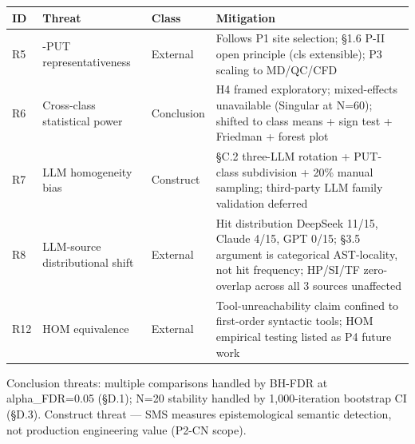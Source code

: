 \documentclass[review,12pt,authoryear]{elsarticle}
\newcounter{none}                   %
\begin{document}
{\def\LTcaptype{none} %
\begin{longtable}[]{@{}
  >{\raggedright\arraybackslash}p{}
  >{\raggedright\arraybackslash}p{}
  >{\raggedright\arraybackslash}p{}
  >{\raggedright\arraybackslash}p{}@{}}
\toprule\noalign{}
\begin{minipage}[b]{\linewidth}\raggedright
ID
\end{minipage} & \begin{minipage}[b]{\linewidth}\raggedright
Threat
\end{minipage} & \begin{minipage}[b]{\linewidth}\raggedright
Class
\end{minipage} & \begin{minipage}[b]{\linewidth}\raggedright
Mitigation
\end{minipage} \\
\midrule\noalign{}
\endhead
\bottomrule\noalign{}
\endlastfoot
R5 & 12-PUT representativeness & External & Follows P1 site selection;
§1.6 P-II open principle (cls extensible); P3 scaling to MD/QC/CFD \\
R6 & Cross-class statistical power & Conclusion & H4 framed exploratory;
mixed-effects unavailable (Singular at N=60); shifted to class means +
sign test + Friedman + forest plot \\
R7 & LLM homogeneity bias & Construct & §C.2 three-LLM rotation +
PUT-class subdivision + 20\% manual sampling; third-party LLM family
validation deferred \\
R8 & LLM-source distributional shift & External & Hit distribution
DeepSeek 11/15, Claude 4/15, GPT 0/15; §3.5 argument is categorical
AST-locality, not hit frequency; HP/SI/TF zero-overlap across all 3
sources unaffected \\
R12 & HOM equivalence & External & Tool-unreachability claim confined to
first-order syntactic tools; HOM empirical testing listed as P4 future
work \\
\end{longtable}
}

Conclusion threats: multiple comparisons handled by BH-FDR at
alpha\_FDR=0.05 (§D.1); N=20 stability handled by 1,000-iteration
bootstrap CI (§D.3). Construct threat --- SMS measures epistemological
semantic detection, not production engineering value (P2-CN scope).
\end{document}
